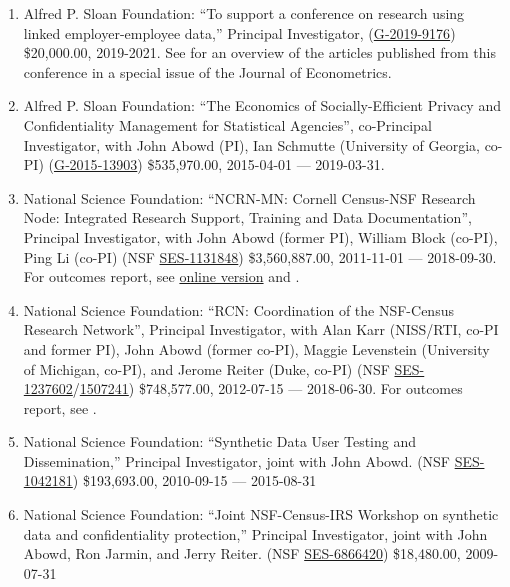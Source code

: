 \documentclass[10pt,letterpaper]{report}
\begin{document}
\begin{enumerate}
  \item Alfred P. Sloan Foundation: ``To support a conference on research using linked employer-employee data,'' Principal Investigator, (\href{https://sloan.org/grant-detail/9176}{G‐2019-9176}) \$20,000.00, 2019-2021. See \cite{CARD2023333} for an overview of the articles published from this conference in a special issue of the Journal of Econometrics.

\item Alfred P. Sloan Foundation: ``The Economics of Socially-Efficient Privacy and Confidentiality Management for Statistical Agencies'', co-Principal Investigator, with John Abowd (PI), Ian Schmutte (University of Georgia, co-PI) (\href{https://sloan.org/grant-detail/6845}{G‐2015‐13903}) \$535,970.00, 2015-04-01 --- 2019-03-31.

\item National Science Foundation: ``NCRN-MN: Cornell Census-NSF Research Node: Integrated Research Support, Training and Data Documentation'', Principal Investigator, with John Abowd (former PI), William Block (co-PI), Ping Li (co-PI) (NSF \href{http://www.nsf.gov/awardsearch/showAward.do?AwardNumber=1131848}{SES-1131848}) \$3,560,887.00, 2011-11-01 --- 2018-09-30. For outcomes report, see  \href{https://ncrncornell.github.io/reports/outcomes-report.html}{online version} and \cite{VilhuberBlock2019}.

\item National Science Foundation: ``RCN: Coordination of the NSF-Census Research Network'', 
Principal Investigator, with Alan Karr (NISS/RTI, co-PI and former PI), John Abowd (former co-PI), Maggie Levenstein (University of Michigan, co-PI), and 
Jerome Reiter (Duke, 
co-PI) (NSF \href{http://www.nsf.gov/awardsearch/showAward.do?AwardNumber=1237602}{SES-1237602}/\href{https://www.nsf.gov/awardsearch/showAward?AWD_ID=1507241}{1507241}) \$748,577.00, 2012-07-15 --- 2018-06-30. For outcomes report, see \cite{ncrn-summary}.

\item National Science Foundation: ``Synthetic Data User Testing and Dissemination,'' Principal Investigator, joint with John Abowd. (NSF \href{http://www.nsf.gov/awardsearch/showAward.do?AwardNumber=1042181}{SES-1042181}) \$193,693.00, 2010-09-15 --- 2015-08-31

\item National Science Foundation: ``Joint NSF-Census-IRS Workshop on
  synthetic data and confidentiality protection,'' Principal Investigator, joint with John Abowd,
  Ron Jarmin, and Jerry Reiter. (NSF \href{http://www.nsf.gov/awardsearch/showAward.do?AwardNumber=6866420}{SES-6866420}) \$18,480.00, 2009-07-31


\end{enumerate}
\end{document}
